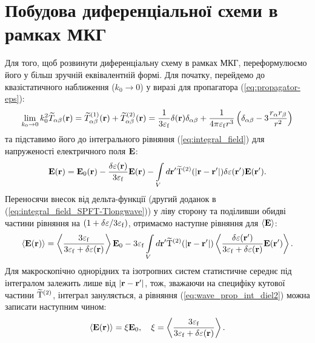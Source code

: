 \documentclass[14pt,twoside]{vakthesis}
\begin{document}
\section{Побудова диференціальної схеми в рамках МКГ}

Для того, щоб розвинути диференціальну схему в рамках МКГ, переформулюємо його у більш зручній еквівалентній формі.
Для початку, перейдемо до квазістатичного наближення ($k_0 \to 0$) у виразі для пропагатора (\ref{eq:propagator-eps}):
\begin{equation}\label{eq:prop_longwave_diel}
\lim\limits_{k_0 \to 0} k_0^2 {\widetilde T}_{\alpha \beta} ( {\mathbf{r}} ) = {\widetilde T}_{\alpha \beta}^{(1)} ( {\mathbf{r}} ) + {\widetilde T}_{\alpha \beta}^{(2)}( {\mathbf{r}} ) = \frac{1}{3 \varepsilon_{\rm f}}\delta ({\mathbf{r}}) \delta_{\alpha \beta}
+ \frac{1}{4\pi \varepsilon_{\rm f} r^3} \left( \delta_{\alpha \beta} - 3 \frac{r_{\alpha} r_{\beta}}{r^2} \right)
\end{equation}
та підставимо його до інтегрального рівняння (\ref{eq:integral_field}) для напруженості електричного поля $\bf E$:
\begin{equation}\label{eq:integral_field_SPFT-Tlongwave}
\mathbf{E}(\mathbf{r}) = \mathbf{E}_0(\mathbf{r}) - \frac{\delta\varepsilon({\bf r})}{3 \varepsilon_{\rm f}} \mathbf{E}(\mathbf{r}) - \int\limits_V {d{\mathbf{r}}'}
{\rm{\widetilde T}}^{(2)} (|{\mathbf{r}} - {\mathbf{r}}'|) \delta \varepsilon ({\mathbf{r}}'){\mathbf{E}}({\mathbf{r}}'). 
\end{equation}
Переносячи внесок від дельта-функції (другий доданок в (\ref{eq:integral_field_SPFT-Tlongwave})) у ліву сторону та поділивши обидві частини рівняння на $(1+\delta\varepsilon/3\varepsilon_{\rm f})$,
отримаємо наступне рівняння для $\langle \bf E \rangle$:
\begin{equation}
\langle \mathbf{E} (\mathbf{r}) \rangle = \left\langle \frac{ 3 \varepsilon_{\rm f}  }{3 \varepsilon_{\rm f} + \delta\varepsilon({\bf r})} \right\rangle \mathbf{E}_0
- 3 \varepsilon_{\rm f} \int\limits_V {d{\mathbf{r}}'} { \rm{\widetilde T}}^{(2)} (| {\bf r} - {\bf r}' |)     \left\langle \frac{\delta \varepsilon ({\mathbf{r}}')}{3 \varepsilon_{\rm f} + \delta \varepsilon({\bf r})}{\mathbf{E}}({\mathbf{r}}') \right\rangle  .
\label{eq:wave_prop_int_diel2}
\end{equation}
Для макроскопічно однорідних та ізотропних систем статистичне
середнє під інтегралом залежить лише від $|{\bf r} - {\bf r}'|$,
тож, зважаючи на специфіку кутової частини ${ \rm{\widetilde T}}^{(2)}$,
інтеграл зануляється, а рівняння (\ref{eq:wave_prop_int_diel2})
можна записати наступним чином:
\begin{equation}\label{eq:E_average_diel}
\langle {\bf E} ({\bf r}) \rangle =  \xi {\bf E}_0,\quad
\xi  = \left\langle { \frac{3 \varepsilon_{\rm f}}{3 \varepsilon_{\rm f} + \delta\varepsilon({\bf r})} } \right\rangle.
\end{equation}
\end{document}
